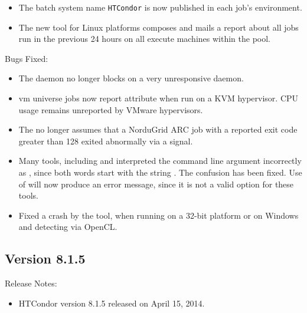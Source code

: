 \begin{itemize}
\item The batch system name \texttt{HTCondor} is now published in 
each job's environment.

\item The new  tool for Linux platforms
composes and mails a report about all jobs run in the previous
24 hours on all execute machines within the pool. 

\end{itemize}

\noindent Bugs Fixed:

\begin{itemize}

\item The  daemon no longer blocks
on a very unresponsive daemon.

\item vm universe jobs now report attribute  when
run on a KVM hypervisor.
CPU usage remains unreported by VMware hypervisors.

\item The  no longer assumes that a NorduGrid ARC job
with a reported exit code greater than 128 exited abnormally via a signal.

\item Many tools, including  and  interpreted
the command line argument  incorrectly as ,
since both words start with the string .
The confusion has been fixed. 
Use of  will now produce an error message, 
since it is not a valid option for these tools.

\item Fixed a crash by the  tool,
when running on a 32-bit platform or on Windows and detecting via OpenCL.

\end{itemize}

\subsection*{\label{sec:New-8-1-5}Version 8.1.5}

\noindent Release Notes:

\begin{itemize}

\item HTCondor version 8.1.5 released on April 15, 2014.

\end{itemize}


